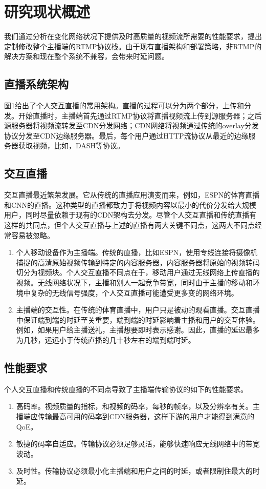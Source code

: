 \chapter{研究现状概述}
我们通过分析在变化网络状况下提供及时高质量的视频流所需要的性能要求，提出定制修改整个主播端的RTMP协议栈。由于现有直播架构和部署策略，非RTMP的解决方案和现在整个系统不兼容，会带来时延问题。

\section{直播系统架构}
图1给出了个人交互直播的常用架构。直播的过程可以分为两个部分，上传和分发。开始直播时，主播端首先通过RTMP协议将直播视频流上传到源服务器；之后源服务器将视频流转发至CDN分发网络；CDN网络将视频通过传统的overlay分发协议分发至CDN边缘服务器。最后，每个用户通过HTTP流协议从最近的边缘服务器获取视频，比如，DASH等协议。

\section{交互直播}
交互直播最近繁荣发展。它从传统的直播应用演变而来，例如，ESPN的体育直播和CNN的直播。这种类型的直播都致力于将视频内容以最小的代价分发给大规模用户，同时尽量依赖于现有的CDN架构去分发。尽管个人交互直播和传统直播有这样的共同点，但个人交互直播与上述的直播有两大关键不同点，这两大不同点经常容易被忽略。
\begin{enumerate}
  \item 个人移动设备作为主播端。传统的直播，比如ESPN，使用专线连接将摄像机捕捉的高清原始视频传输到特定的内容服务器，内容服务器将原始的视频转码切分为视频块。个人交互直播不同点在于，移动用户通过无线网络上传直播的视频。无线网络状况下，主播和别人一起竞争带宽，同时由于主播的移动和环境中复杂的无线信号强度，个人交互直播可能遭受更多变的网络环境。
  \item 主播端的交互性。在传统的体育直播中，用户只是被动的观看直播。交互直播中保证端到端的时延至关重要，端到端的时延影响着主播和用户的交互体验。例如，如果用户给主播送礼，主播想要即时表示感谢。因此，直播的延迟最多为几秒，远远小于传统直播的几十秒左右的端到端时延。
\end{enumerate}

\section{性能要求}
个人交互直播和传统直播的不同点导致了主播端传输协议的如下的性能要求。
\begin{enumerate}
  \item 高码率。视频质量的指标，和视频的码率，每秒的帧率，以及分辨率有关。主播端应传输最高可用的码率到CDN服务器，这样下游的用户才能得到满意的QoE。
  \item 敏捷的码率自适应。传输协议必须足够灵活，能够快速响应无线网络中的带宽波动。
  \item 及时性。传输协议必须最小化主播端和用户之间的时延，或者限制住最大的时延。
\end{enumerate}

